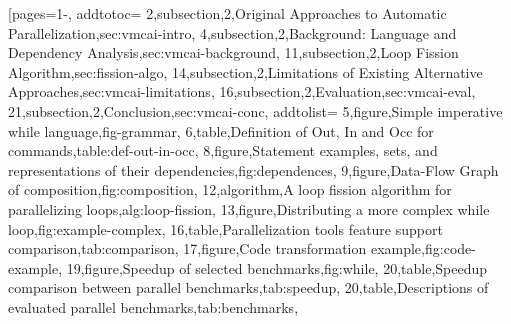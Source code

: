 [pages={1-},
    addtotoc={
        2,subsection,2,{Original Approaches to Automatic Parallelization},sec:vmcai-intro,
        4,subsection,2,{Background: Language and Dependency Analysis},sec:vmcai-background,
        11,subsection,2,{Loop Fission Algorithm},sec:fission-algo,
        14,subsection,2,{Limitations of Existing Alternative Approaches},sec:vmcai-limitations,
        16,subsection,2,{Evaluation},sec:vmcai-eval,
        21,subsection,2,{Conclusion},sec:vmcai-conc},
    addtolist={
        5,figure,{Simple imperative while language},fig-grammar,
        6,table,{Definition of Out, In and Occ for commands},table:def-out-in-occ,
        8,figure,{Statement examples, sets, and representations of their dependencies},fig:dependences,
        9,figure,{Data-Flow Graph of composition},fig:composition,
        12,algorithm,{A loop fission algorithm for parallelizing loops},alg:loop-fission,
        13,figure,{Distributing a more complex while loop},fig:example-complex,
        16,table,{Parallelization tools feature support comparison},tab:comparison,
        17,figure,{Code transformation example},fig:code-example,
        19,figure,{Speedup of selected benchmarks},fig:while,
        20,table,{Speedup comparison between parallel benchmarks},tab:speedup,
        20,table,{Descriptions of evaluated parallel benchmarks},tab:benchmarks},
